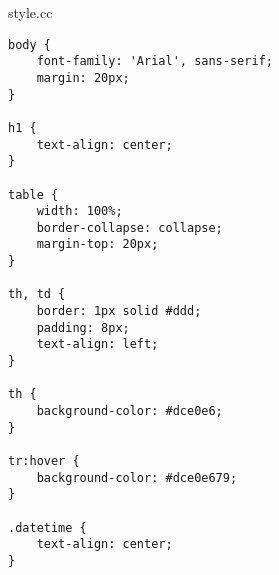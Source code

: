\documentclass[12pt,a4paper]{article}
\begin{document}
style.cc
\begin{lstlisting}[style=CSS, label=CSS]
body {
    font-family: 'Arial', sans-serif;
    margin: 20px;
}

h1 {
    text-align: center;
}

table {
    width: 100%;
    border-collapse: collapse;
    margin-top: 20px;
}

th, td {
    border: 1px solid #ddd;
    padding: 8px;
    text-align: left;
}

th {
    background-color: #dce0e6;
}

tr:hover {
    background-color: #dce0e679;
}

.datetime {
    text-align: center;
}
\end{lstlisting}
\noindent\hrulefill
\end{document}
